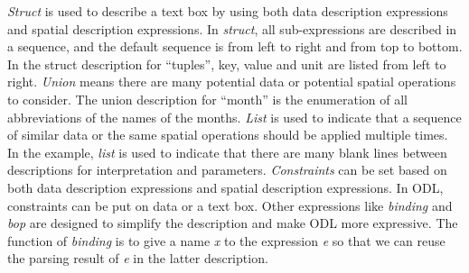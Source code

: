{%
{\em Struct} is used to describe a text box by using both data description 
expressions and spatial description expressions. 
In {\em struct}, all sub-expressions are described in a sequence, 
and the default sequence is from left to right and from top to bottom. In the struct description for ``tuples'', key, value and unit are listed from left to right. 
{\em Union} means there are many potential data or potential spatial operations to consider. The union description for ``month'' is the enumeration of all abbreviations of the names of the months.
{\em List} is used to indicate that a sequence of similar data or the same spatial operations should be applied multiple times. In the example, {\em list} is used to indicate that there are many blank lines between descriptions for interpretation and parameters.
{\em Constraints} can  
be set based on both data description expressions and 
spatial description expressions. In ODL, constraints can be put on 
data or a text box. 
Other expressions like {\em binding} and {\em bop} are designed to 
simplify the description and make ODL more expressive. 
The function of {\em binding} is to give a name {\em x} to 
the expression {\em e} so that we can reuse the parsing result of {\em e} 
in the latter description. 


}
